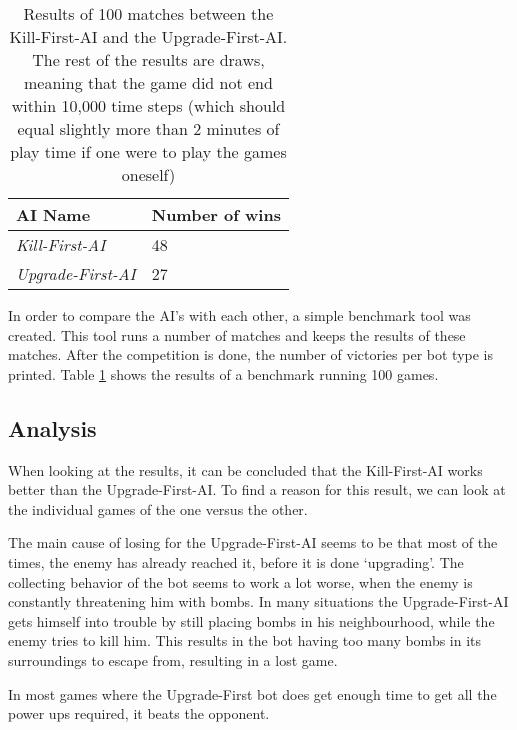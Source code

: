 \begin{table}
\centering
\begin{tabular}{l|l}
\textbf{AI Name} & \textbf{Number of wins}\\\hline
\textit{Kill-First-AI} & 48 \\
\textit{Upgrade-First-AI} & 27\\
\end{tabular}
\caption{Results of 100 matches between the Kill-First-AI and the
Upgrade-First-AI. The rest of the results are draws, meaning that the game did
not end within 10,000 time steps (which should equal slightly more than
2 minutes of play time if one were to play the games oneself)}
\label{tab:results}
\end{table}

In order to compare the AI's with each other, a simple benchmark tool was
created. This tool runs a number of matches and keeps the results of these
matches. After the competition is done, the number of victories per bot type is
printed. Table \ref{tab:results} shows the results of a benchmark running 100
games.

\subsection{Analysis}
When looking at the results, it can be concluded that the Kill-First-AI works
better than the Upgrade-First-AI. To find a reason for this result, we can look
at the individual games of the one versus the other.

The main cause of losing for the Upgrade-First-AI seems to be that most of the
times, the enemy has already reached it, before it is done `upgrading'. The
collecting behavior of the bot seems to work a lot worse, when the enemy is
constantly threatening him with bombs. In many situations the Upgrade-First-AI
gets himself into trouble by still placing bombs in his neighbourhood, while the
enemy tries to kill him. This results in the bot having too many bombs in its
surroundings to escape from, resulting in a lost game. 

In most games where the
Upgrade-First bot does get enough time to get all the power ups required, it beats the
opponent.


